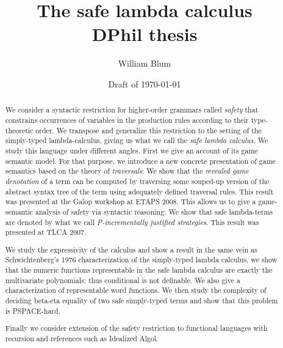 


\makeindex



\author{William Blum}
\title{The safe lambda calculus  \\{\small DPhil thesis}}
\renewcommand{\crest}{\beltcrest}

\date{Draft of \today}

\setcounter{secnumdepth}{3}
\setcounter{tocdepth}{3}


\maketitle

\begin{abstract}
We consider a syntactic restriction for higher-order grammars called \emph{safety}  that  constrains occurrences of variables in the production rules according to their type-theoretic order. We transpose and generalize this restriction to the setting of the simply-typed lambda-calculus, giving us what we call the \emph{safe lambda calculus}. We study this language under different angles. First we give an account of its game semantic model. For that purpose, we introduce a new concrete presentation of game semantics based on the theory of \emph{traversals}: We show that the \emph{revealed game denotation} of a term can be computed by traversing some souped-up version of the abstract syntax tree of the term using adequately defined traversal rules. This result was presented at the Galop workshop at ETAPS 2008. This allows us to give a game-semantic analysis of safety via syntactic reasoning: We show that  safe lambda-terms are denoted by what we call \emph{P-incrementally justified strategies}. This result was presented at TLCA 2007.

We study the expressivity of the calculus and show a result in the
same vein as Schwichtenberg's 1976 characterization of the
simply-typed lambda calculus, we show that the numeric functions
representable in the safe lambda calculus are exactly the
multivariate polynomials; thus conditional is not definable. We
also give a characterization of representable word functions.
We then study the complexity of deciding beta-eta equality of two safe simply-typed terms and show that this problem is PSPACE-hard.

Finally we consider extension of the safety restriction to functional languages with recursion and references such as Idealized Algol.

\end{abstract}

